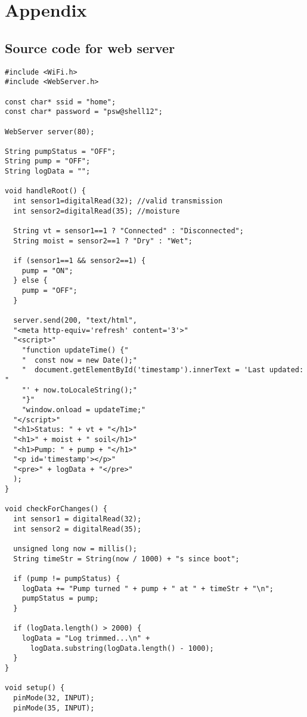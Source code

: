 \newpage
{}
{}
\chapter*{Appendix}
\setlength\parindent{1cm}
\section*{Source code for web server}
\setmonofont{IBM Plex Mono}
\fontsize{11}{11}\selectfont
{}
\begin{verbatim}
#include <WiFi.h>
#include <WebServer.h>

const char* ssid = "home";
const char* password = "psw@shell12";

WebServer server(80);

String pumpStatus = "OFF";
String pump = "OFF";
String logData = "";

void handleRoot() {
  int sensor1=digitalRead(32); //valid transmission
  int sensor2=digitalRead(35); //moisture
 
  String vt = sensor1==1 ? "Connected" : "Disconnected";
  String moist = sensor2==1 ? "Dry" : "Wet";
  
  if (sensor1==1 && sensor2==1) {
    pump = "ON";
  } else {
    pump = "OFF";
  }

  server.send(200, "text/html",
  "<meta http-equiv='refresh' content='3'>"
  "<script>"
    "function updateTime() {"
    "  const now = new Date();"
    "  document.getElementById('timestamp').innerText = 'Last updated: "
    "' + now.toLocaleString();"
    "}"
    "window.onload = updateTime;"
  "</script>"
  "<h1>Status: " + vt + "</h1>"
  "<h1>" + moist + " soil</h1>"
  "<h1>Pump: " + pump + "</h1>"
  "<p id='timestamp'></p>"
  "<pre>" + logData + "</pre>"
  );
}

void checkForChanges() {
  int sensor1 = digitalRead(32);
  int sensor2 = digitalRead(35);

  unsigned long now = millis();
  String timeStr = String(now / 1000) + "s since boot";

  if (pump != pumpStatus) {
    logData += "Pump turned " + pump + " at " + timeStr + "\n";
    pumpStatus = pump;
  }

  if (logData.length() > 2000) {
    logData = "Log trimmed...\n" +
      logData.substring(logData.length() - 1000);
  }
}

void setup() {
  pinMode(32, INPUT);
  pinMode(35, INPUT);


\end{verbatim}

